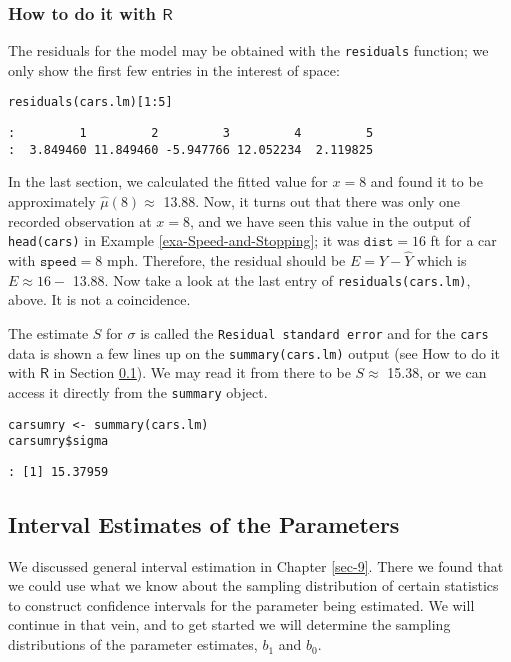 \subsubsection{How to do it with \(\mathsf{R}\)}
\label{sec-11-2-3-1}

The residuals for the model may be obtained with the \texttt{residuals}
function; we only show the first few entries in the interest of space:

\begin{verbatim}
residuals(cars.lm)[1:5]
\end{verbatim}

\begin{verbatim}
:         1         2         3         4         5 
:  3.849460 11.849460 -5.947766 12.052234  2.119825
\end{verbatim}

In the last section, we calculated the fitted value for \(x=8\) and
found it to be approximately \( \hat{\mu}(8) \approx\) 
13.88. Now, it turns out that there was only one recorded observation
at \(x = 8\), and we have seen this value in the output of
\texttt{head(cars)} in Example \ref{exa-Speed-and-Stopping}; it was \(\mathtt{dist}
= 16\) ft for a car with \( \mathtt{speed} = 8 \) mph. Therefore, the
residual should be \(E = Y - \hat{Y}\) which is \(E \approx 16 - \)
13.88. Now take a look at the last entry of
\texttt{residuals(cars.lm)}, above. It is not a coincidence.

The estimate \(S\) for \(\sigma\) is called the \texttt{Residual standard
error} and for the \texttt{cars} data is shown a few lines up on the
\texttt{summary(cars.lm)} output (see How to do it with \(\mathsf{R}\) in
Section \ref{sec-11-2-4}). We may read it from there to be \(
S\approx\) 15.38, or we can access it directly from the
\texttt{summary} object.

\begin{verbatim}
carsumry <- summary(cars.lm)
carsumry$sigma
\end{verbatim}

\begin{verbatim}
: [1] 15.37959
\end{verbatim}

\subsection{Interval Estimates of the Parameters}
\label{sec-11-2-4}

We discussed general interval estimation in Chapter \ref{sec-9}. There
we found that we could use what we know about the sampling
distribution of certain statistics to construct confidence intervals
for the parameter being estimated. We will continue in that vein, and
to get started we will determine the sampling distributions of the
parameter estimates, \(b_{1}\) and \(b_{0}\).


